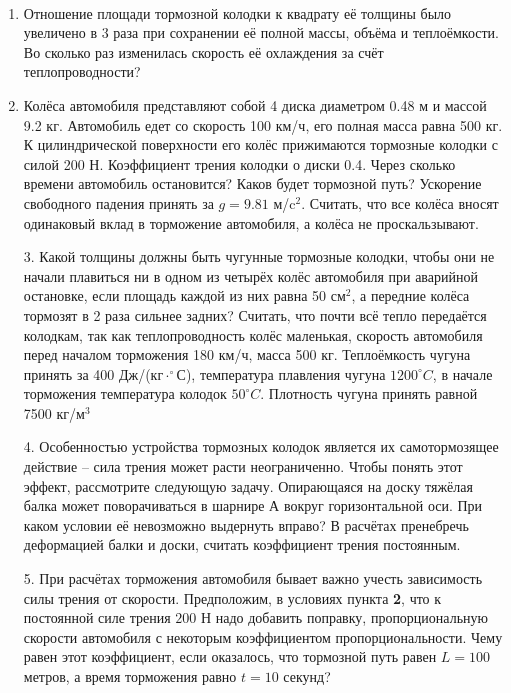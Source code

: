 \textbf{}\\
\begin{wrapfigure}{r}{3in}
\centering 
{}
\end{wrapfigure}
\begin{enumerate}
\item Отношение площади тормозной колодки к квадрату её толщины было увеличено в 3 раза при сохранении её полной массы, объёма и теплоёмкости. Во сколько раз изменилась скорость её охлаждения за счёт теплопроводности? 
\item Колёса автомобиля представляют собой 4 диска диаметром 0.48 м и массой 9.2 кг. Автомобиль едет со скорость 100 км/ч, его полная масса равна 500 кг. К цилиндрической поверхности его колёс прижимаются тормозные колодки с силой 200 Н. Коэффициент трения колодки о диски 0.4. Через сколько времени автомобиль остановится? Каков будет тормозной путь? Ускорение свободного падения принять за $g = 9.81$ м/c$^2$. Считать, что все колёса вносят одинаковый вклад в торможение автомобиля, а колёса не проскальзывают.
\end{enumerate}
\hspace{1pt}
\begin{enumerate}
\item [3.] Какой толщины должны быть чугунные тормозные колодки, чтобы они не начали плавиться ни в одном из четырёх колёс автомобиля при аварийной остановке, если площадь каждой из них равна 50 см$^2$, а передние колёса тормозят в 2 раза сильнее задних? Считать, что почти всё тепло передаётся колодкам, так как теплопроводность колёс маленькая, скорость автомобиля перед началом торможения 180 км/ч, масса 500 кг.  Теплоёмкость чугуна принять за 400 Дж/(кг$\cdot^{\circ}$С), температура плавления чугуна $1200^{\circ}C$, в начале торможения температура колодок $50^{\circ}C$. Плотность чугуна принять равной 7500 кг/м$^3$
\item [4.] Особенностью устройства тормозных колодок является их самотормозящее действие – сила трения может расти неограниченно. Чтобы понять этот эффект, рассмотрите следующую задачу. Опирающаяся на доску тяжёлая балка может поворачиваться в шарнире А вокруг горизонтальной оси. При каком условии её невозможно выдернуть вправо? В расчётах пренебречь деформацией балки и доски, считать коэффициент трения постоянным.  
\item [5.] При расчётах торможения автомобиля бывает важно учесть зависимость силы трения от скорости. Предположим, в условиях пункта \textbf{2}, что к постоянной силе трения $200$ Н надо добавить поправку, пропорциональную скорости автомобиля с некоторым коэффициентом пропорциональности. Чему равен этот коэффициент, если оказалось, что тормозной путь равен $L = 100$ метров, а время торможения равно $t = 10$ секунд?
\end{enumerate}

